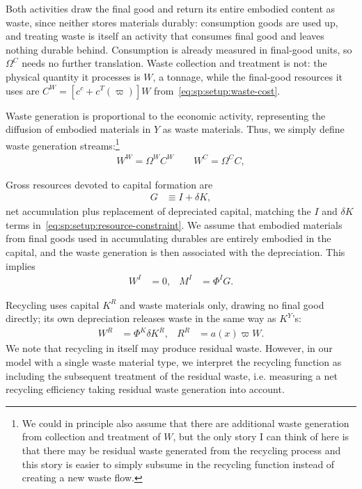  Both activities draw the final good and return its entire embodied content as waste, since neither stores materials durably: consumption goods are used up, and treating waste is itself an activity that consumes final good and leaves nothing durable behind. Consumption is already measured in final-good units, so $\Omega^C$ needs no further translation. Waste collection and treatment is not: the physical quantity it processes is $W$, a tonnage, while the final-good resources it uses are $C^W=\left[c^c+c^T(\varpi)\right]W$ from~\eqref{eq:sp:setup:waste-cost}. 


Waste generation is proportional to the economic activity, representing the diffusion of embodied materials in $Y$ as waste materials. Thus, we simply define waste generation streams:\footnote{We could in principle also assume that there are additional waste generation from collection and treatment of $W$, but the only story I can think of here is that there may be residual waste generated from the recycling process and this story is easier to simply subsume in the recycling function instead of creating a new waste flow.}
\begin{align}
    W^W = \Omega^{W} C^W \qquad W^C= \Omega^C C, \label{eq:sp:setup:wc}
\end{align}


 Gross resources devoted to capital formation are
\begin{align}
G &\equiv I+\delta K,
\label{eq:sp:setup:gross-formation}
\end{align}
net accumulation plus replacement of depreciated capital, matching the $I$ and $\delta K$ terms in~\eqref{eq:sp:setup:resource-constraint}. We assume that embodied materials from final goods used in accumulating durables are entirely embodied in the capital, and the waste generation is then associated with the depreciation. This implies
\begin{align}
    W^I &= 0, & M^I &= \Phi^IG.
\label{eq:sp:setup:investment}
\end{align}


 Recycling uses capital $K^R$ and waste materials only, drawing no final good directly; its own depreciation releases waste in the same way as $K^Y$'s:
\begin{align}
W^R &= \Phi^K\delta K^R, & R^R &= a\!\left(x\right)\varpi W.
\label{eq:sp:setup:recycling-mass}
\end{align}
We note that recycling in itself may produce residual waste. However, in our model with a single waste material type, we interpret the recycling function as including the subsequent treatment of the residual waste, i.e. measuring a net recycling efficiency taking residual waste generation into account. 

